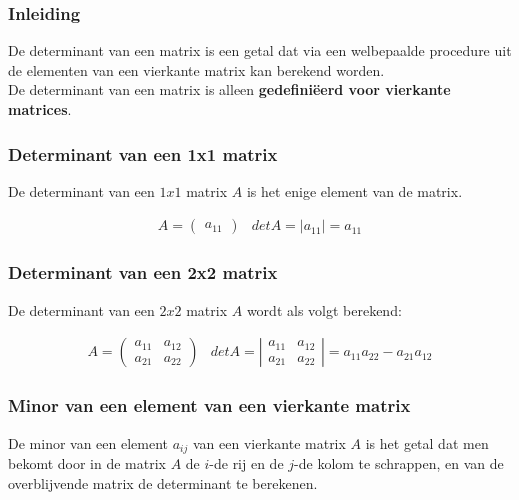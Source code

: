 \subsubsection{Inleiding}

De determinant van een matrix is een getal dat via een welbepaalde procedure uit de elementen van een vierkante matrix kan berekend worden.\\
De determinant van een matrix is alleen {\bf gedefini\"{e}erd voor vierkante matrices}.\\

\subsubsection{Determinant van een 1x1 matrix}

De determinant van een $1x1$ matrix $A$ is het enige element van de matrix.

\[ \begin{array}{ll}
A=\left( \begin{matrix} a_{11} \end{matrix} \right) & det A = |a_{11}|=a_{11} 
\end{array}
\]

\subsubsection{Determinant van een 2x2 matrix}

De determinant van een $2x2$ matrix $A$ wordt als volgt berekend:

\[ \begin{array}{ll}
A=\left( \begin{matrix} a_{11} & a_{12} \\ a_{21} & a_{22}  \end{matrix} \right) & det A = \left| \begin{matrix} a_{11} & a_{12} \\ a_{21} & a_{22}  \end{matrix} \right| = a_{11}a_{22}-a_{21}a_{12}   
\end{array}
\]

\subsubsection{Minor van een element van een vierkante matrix}

De minor van een element $a_{ij}$ van een vierkante matrix $A$ is het getal dat men bekomt door in de matrix $A$ de $i$-de rij en de $j$-de kolom te schrappen, en van de overblijvende matrix de determinant te berekenen.\\


